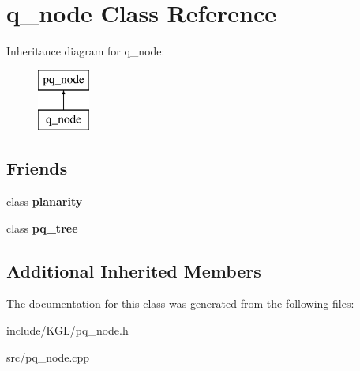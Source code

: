 \hypertarget{classq__node}{}\section{q\+\_\+node Class Reference}
\label{classq__node}
Inheritance diagram for q\+\_\+node\+:\begin{figure}[H]
\begin{center}
\leavevmode
\includegraphics[height=2.000000cm]{classq__node}
\end{center}
\end{figure}
\subsection*{Friends}
\begin{DoxyCompactItemize}
\item 
\mbox{\label{classq__node_ab6a02224dbc06343d95919289aec77c8}} 
class {\bfseries planarity}
\item 
\mbox{\label{classq__node_a0a5be4bb438c891059fae98f607f2a9c}} 
class {\bfseries pq\+\_\+tree}
\end{DoxyCompactItemize}
\subsection*{Additional Inherited Members}


The documentation for this class was generated from the following files\+:\begin{DoxyCompactItemize}
\item 
include/\+K\+G\+L/pq\+\_\+node.\+h\item 
src/pq\+\_\+node.\+cpp\end{DoxyCompactItemize}
